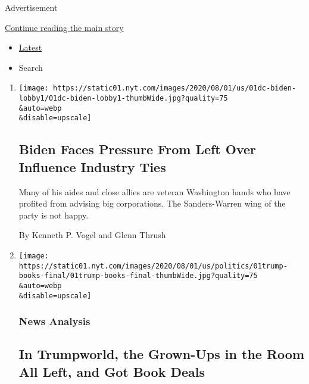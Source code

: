 Advertisement

\protect\hyperlink{after-mid1}{Continue reading the main story}

\begin{itemize}
\tightlist
\item
  \protect\hyperlink{stream-panel}{Latest}
\item
  Search
\end{itemize}

\begin{enumerate}
\def\labelenumi{\arabic{enumi}.}
\item
  \href{/2020/08/01/us/politics/biden-lobbyist-ties.html}{}

  \texttt{[image: https://static01.nyt.com/images/2020/08/01/us/01dc-biden-lobby1/01dc-biden-lobby1-thumbWide.jpg?quality=75\\\&auto=webp\\\&disable=upscale]}

  \hypertarget{biden-faces-pressure-from-left-over-influence-industry-ties}{%
  \subsection{Biden Faces Pressure From Left Over Influence Industry
  Ties}\label{biden-faces-pressure-from-left-over-influence-industry-ties}}

  Many of his aides and close allies are veteran Washington hands who
  have profited from advising big corporations. The Sanders-Warren wing
  of the party is not happy.

  By Kenneth P. Vogel and Glenn Thrush
\item
  \href{/2020/08/01/us/politics/trump-books.html}{}

  \texttt{[image: https://static01.nyt.com/images/2020/08/01/us/politics/01trump-books-final/01trump-books-final-thumbWide.jpg?quality=75\\\&auto=webp\\\&disable=upscale]}

  \hypertarget{news-analysis-1}{%
  \subsubsection{News Analysis}\label{news-analysis-1}}

  \hypertarget{in-trumpworld-the-grown-ups-in-the-room-all-left-and-got-book-deals-1}{%
  \subsection{In Trumpworld, the Grown-Ups in the Room All Left, and Got
  Book
  Deals}\label{in-trumpworld-the-grown-ups-in-the-room-all-left-and-got-book-deals-1}}


\end{enumerate}
